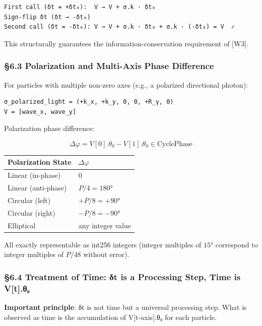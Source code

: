 \documentclass[a4paper,11pt]{article}
\newcounter{none}
\begin{document}
\begin{verbatim}
First call (δt = +δt₀):  V → V + σ.k · δt₀
Sign-flip δt (δt → -δt₀)
Second call (δt = -δt₀): V → V + σ.k · δt₀ + σ.k · (-δt₀) = V  ✓
\end{verbatim}

This structurally guarantees the information-conservation requirement of
{[}W3{]}.

\subsubsection{§6.3 Polarization and Multi-Axis Phase
Difference}\label{polarization-and-multi-axis-phase-difference}

For particles with multiple non-zero axes (e.g., a polarized directional
photon):

\begin{verbatim}
σ_polarized_light = (+k_x, +k_y, 0, 0, +R_γ, 0)
V = [wave_x, wave_y]
\end{verbatim}

Polarization phase difference:

\[\Delta\varphi = V[0].\theta_0 - V[1].\theta_0 \in \text{CyclePhase}\]

{\def\LTcaptype{none} %
\begin{longtable}[]{@{}ll@{}}
\toprule\noalign{}
Polarization State & \(\Delta\varphi\) \\
\midrule\noalign{}
\endhead
\bottomrule\noalign{}
\endlastfoot
Linear (in-phase) & \(0\) \\
Linear (anti-phase) & \(P/4 = 180°\) \\
Circular (left) & \(+P/8 = +90°\) \\
Circular (right) & \(-P/8 = -90°\) \\
Elliptical & any integer value \\
\end{longtable}
}

All exactly representable as int256 integers (integer multiples of
\(15°\) correspond to integer multiples of \(P/48\) without error).

\subsubsection{§6.4 Treatment of Time: δt is a Processing Step, Time is
V{[}t{]}.θ₀}\label{treatment-of-time-ux3b4t-is-a-processing-step-time-is-vt.ux3b8ux2080}

\textbf{Important principle}: δt is not time but a universal processing
step. What is observed as time is the accumulation of V{[}t-axis{]}.θ₀
for each particle.
\end{document}
